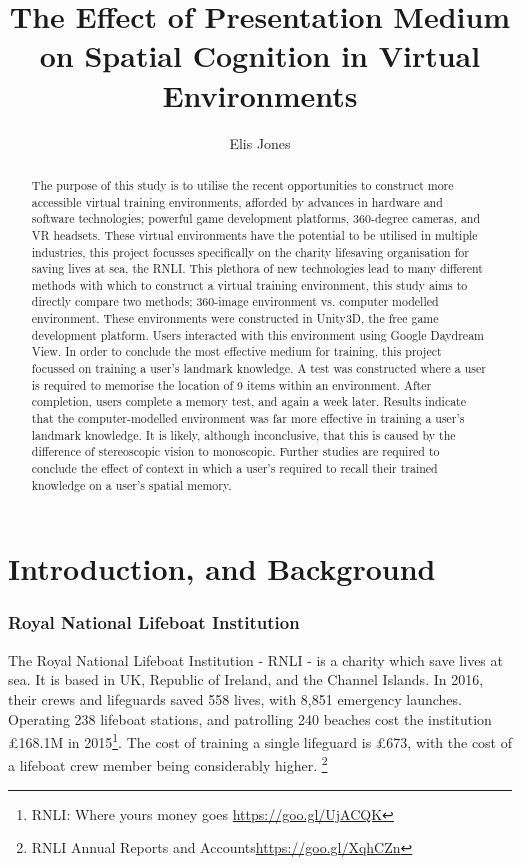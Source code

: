 \documentclass[a4paper, openright, twoside]{report}
\date{}
\title{The Effect of Presentation Medium on Spatial Cognition in Virtual Environments}
\author{Elis Jones}
\begin{document}
\maketitle

\tableofcontents{}

\begin{abstract}
The purpose of this study is to utilise the recent opportunities to construct more accessible virtual training environments, afforded by advances in hardware and software technologies; powerful game development platforms, 360-degree cameras, and VR headsets. These virtual environments have the potential to be utilised in multiple industries, this project focusses specifically on the charity lifesaving organisation for saving lives at sea, the RNLI. This plethora of new technologies lead to many different methods with which to construct a virtual training environment, this study aims to directly compare two methods; 360-image environment vs. computer modelled environment. These environments were constructed in Unity3D, the free game development platform. Users interacted with this environment using Google Daydream View. In order to conclude the most effective medium for training, this project focussed on training a user's landmark knowledge. A test was constructed where a user is required to memorise the location of 9 items within an environment. After completion, users complete a memory test, and again a week later. Results indicate that the computer-modelled environment was far more effective in training a user's landmark knowledge. It is likely, although inconclusive, that this is caused by the difference of stereoscopic vision to monoscopic. Further studies are required to conclude the effect of context in which a user's required to recall their trained knowledge on a user's spatial memory.  
\end{abstract}

\chapter{Introduction, and Background}\label{intro_chapter}

\subsection{Royal National Lifeboat Institution}
The Royal National Lifeboat Institution - RNLI - is a charity which save lives at sea. It is based in UK, Republic of Ireland, and the Channel Islands. In 2016, their crews and lifeguards saved 558 lives, with 8,851 emergency launches. Operating 238 lifeboat stations, and patrolling 240 beaches cost the institution £168.1M in 2015\footnote{RNLI: Where yours money goes \url{https://goo.gl/UjACQK}}. The cost of training a single lifeguard is £673, with the cost of a lifeboat crew member being considerably higher. \footnote{ RNLI Annual Reports and Accounts\url{https://goo.gl/XqhCZn}} 
\end{document}
